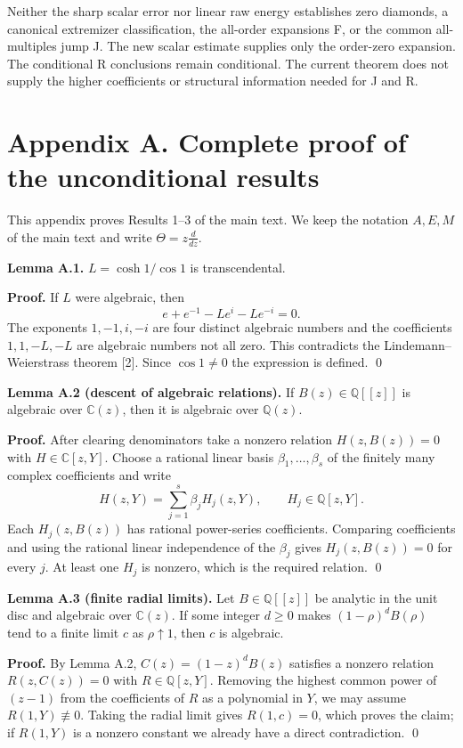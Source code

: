 \documentclass[11pt]{article}
\begin{document}
Neither the sharp scalar error nor linear raw energy establishes zero diamonds,
a canonical extremizer classification, the all-order expansions F, or the
common all-multiples jump J. The new scalar estimate supplies only the
order-zero expansion. The conditional R conclusions remain conditional.
The current theorem does not supply the higher coefficients or structural information needed for J and R.

\section*{Appendix A. Complete proof of the unconditional results}
This appendix proves Results 1--3 of the main text. We keep the notation $A,E,M$ of the main text and write $\Theta=z\frac{d}{dz}$.

\textbf{Lemma A.1.} $L=\cosh1/\cos1$ is transcendental.

\textbf{Proof.} If $L$ were algebraic, then
\[
e+e^{-1}-Le^i-Le^{-i}=0.
\]
The exponents $1,-1,i,-i$ are four distinct algebraic numbers and the coefficients $1,1,-L,-L$ are algebraic numbers not all zero. This contradicts the Lindemann--Weierstrass theorem [2]. Since $\cos1\ne0$ the expression is defined. \qed

\textbf{Lemma A.2 (descent of algebraic relations).} If $B(z)\in\mathbb Q[[z]]$ is algebraic over $\mathbb C(z)$, then it is algebraic over $\mathbb Q(z)$.

\textbf{Proof.} After clearing denominators take a nonzero relation $H(z,B(z))=0$ with $H\in\mathbb C[z,Y]$. Choose a rational linear basis $\beta_1,\ldots,\beta_s$ of the finitely many complex coefficients and write
\[
H(z,Y)=\sum_{j=1}^s\beta_jH_j(z,Y),\qquad H_j\in\mathbb Q[z,Y].
\]
Each $H_j(z,B(z))$ has rational power-series coefficients. Comparing coefficients and using the rational linear independence of the $\beta_j$ gives $H_j(z,B(z))=0$ for every $j$. At least one $H_j$ is nonzero, which is the required relation. \qed

\textbf{Lemma A.3 (finite radial limits).} Let $B\in\mathbb Q[[z]]$ be analytic in the unit disc and algebraic over $\mathbb C(z)$. If some integer $d\ge0$ makes $(1-\rho)^dB(\rho)$ tend to a finite limit $c$ as $\rho\uparrow1$, then $c$ is algebraic.

\textbf{Proof.} By Lemma A.2, $C(z)=(1-z)^dB(z)$ satisfies a nonzero relation $R(z,C(z))=0$ with $R\in\mathbb Q[z,Y]$. Removing the highest common power of $(z-1)$ from the coefficients of $R$ as a polynomial in $Y$, we may assume $R(1,Y)\not\equiv0$. Taking the radial limit gives $R(1,c)=0$, which proves the claim; if $R(1,Y)$ is a nonzero constant we already have a direct contradiction. \qed
\end{document}
